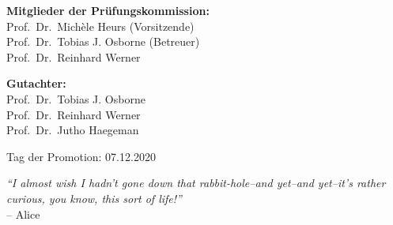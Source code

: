\setcounter{page}{0}

\thispagestyle{empty}

\noindent \textbf{Mitglieder der Prüfungskommission:}\vspace*{0.5\baselineskip}\\
Prof.\ Dr.\ Michèle Heurs (Vorsitzende)\\
Prof.\ Dr.\ Tobias J. Osborne (Betreuer)\\
Prof.\ Dr.\ Reinhard Werner

\vspace*{1.5\baselineskip}

\noindent \textbf{Gutachter:}\vspace*{0.5\baselineskip}\\
Prof.\ Dr.\ Tobias J. Osborne \\
Prof.\ Dr.\ Reinhard Werner\\
Prof.\ Dr.\ Jutho Haegeman

\vspace*{1.5\baselineskip}

\noindent Tag der Promotion: 07.12.2020

\cleardoublepage


\vspace*{8cm}

\thispagestyle{empty}

\begin{flushright}
	\large
	\noindent
	\hspace{40pt}
	\textit{``I almost wish I hadn't gone down that rabbit-hole--and yet--and yet--it's rather curious, you know, this sort of life!''}\\
	\vspace{5pt}
	\normalsize 
	-- Alice
	\newpage
\end{flushright}

\cleardoublepage

